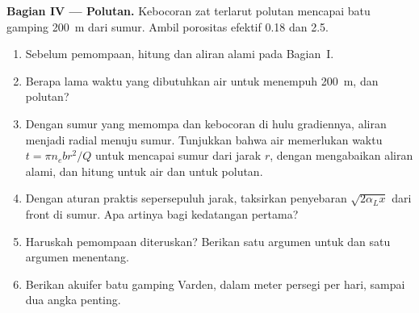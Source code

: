 \begin{problem}
\medskip\noindent\textbf{Bagian IV --- Polutan.} Kebocoran zat terlarut
polutan mencapai batu gamping \qty{200}{m} dari sumur. Ambil
porositas efektif 0.18 dan  2.5.
\begin{enumerate}[resume]
\item Sebelum pemompaan, hitung  dan 
  aliran alami pada Bagian~I.
\item Berapa lama waktu yang dibutuhkan air untuk menempuh \qty{200}{m}, dan
  polutan?
\item Dengan sumur yang memompa dan kebocoran di hulu gradiennya, aliran
  menjadi radial menuju sumur. Tunjukkan bahwa air memerlukan waktu $t = \pi n_e b
  r^2/Q$ untuk mencapai sumur dari jarak $r$, dengan mengabaikan aliran
  alami, dan hitung untuk air dan untuk polutan.
\item Dengan aturan praktis  sepersepuluh jarak,
  taksirkan penyebaran $\sqrt{2\alpha_Lx}$ dari front di sumur. Apa
  artinya bagi kedatangan pertama?
\item Haruskah pemompaan diteruskan? Berikan satu argumen untuk dan satu argumen menentang.
\item Berikan  akuifer batu gamping Varden, dalam meter persegi
  per hari, sampai dua angka penting.
\end{enumerate}
\end{problem}
